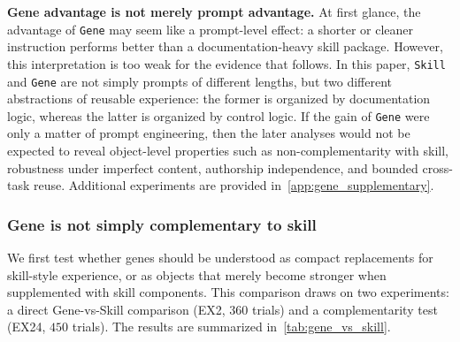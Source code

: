 \documentclass{article}
\newcommand{\nbf}[1]{{\noindent \textbf{#1}}}
\begin{document}
\nbf{Gene advantage is not merely prompt advantage.}
At first glance, the advantage of \texttt{Gene} may seem like a prompt-level effect: a shorter or cleaner instruction performs better than a documentation-heavy skill package. However, this interpretation is too weak for the evidence that follows. In this paper, \texttt{Skill} and \texttt{Gene} are not simply prompts of different lengths, but two different abstractions of reusable experience: the former is organized by documentation logic, whereas the latter is organized by control logic. If the gain of \texttt{Gene} were only a matter of prompt engineering, then the later analyses would not be expected to reveal object-level properties such as non-complementarity with skill, robustness under imperfect content, authorship independence, and bounded cross-task reuse.
Additional experiments are provided in~\cref{app:gene_supplementary}.

\subsubsection{Gene is not simply complementary to skill}

We first test whether genes should be understood as compact replacements for skill-style experience, or as objects that merely become stronger when supplemented with skill components.
This comparison draws on two experiments: a direct Gene-vs-Skill comparison (EX2, $360$ trials) and a complementarity test (EX24, $450$ trials). The results are summarized in~\cref{tab:gene_vs_skill}.
\end{document}

